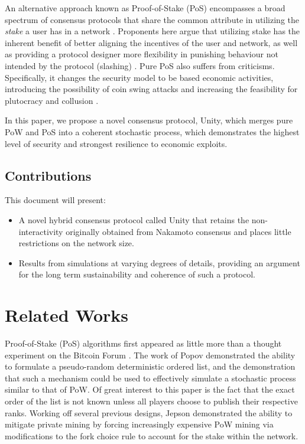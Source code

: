 \documentclass[a4paper]{article}
\begin{document}
An alternative approach known as Proof-of-Stake (PoS) encompasses a broad spectrum of consensus protocols that share the common attribute in utilizing the \textit{stake} a user has in a network \cite{BentovGM14}. Proponents here argue that utilizing stake has the inherent benefit of better aligning the incentives of the user and network, as well as providing a protocol designer more flexibility in punishing behaviour not intended by the protocol (slashing) \cite{ethereum1}. Pure PoS also suffers from criticisms. Specifically, it changes the security model to be based economic activities, introducing the possibility of coin swing attacks and increasing the feasibility for plutocracy and collusion \cite{buterin_plutocracy}.

In this paper, we propose a novel consensus protocol, Unity, which merges pure PoW and PoS into a coherent stochastic process, which demonstrates the highest level of security and strongest resilience to economic exploits.

\subsection{Contributions}

This document will present:

\begin{itemize}
    \item A novel hybrid consensus protocol called Unity that retains the non-interactivity originally obtained from Nakamoto consensus and places little restrictions on the network size.
    \item Results from simulations at varying degrees of details, providing an argument for the long term sustainability and coherence of such a protocol.
\end{itemize}

\section{Related Works}

Proof-of-Stake (PoS) algorithms first appeared as little more than a thought experiment on the Bitcoin Forum \cite{bitcointalk2011pos}. The work of Popov \cite{popov2016probabilistic} demonstrated the ability to formulate a pseudo-random deterministic ordered list, and the demonstration that such a mechanism could be used to effectively simulate a stochastic process similar to that of PoW. Of great interest to this paper is the fact that the exact order of the list is not known unless all players choose to publish their respective ranks. Working off several previous designs, Jepson \cite{jepson2015} demonstrated the ability to mitigate private mining by forcing increasingly expensive PoW mining via modifications to the fork choice rule to account for the stake within the network.
\end{document}
